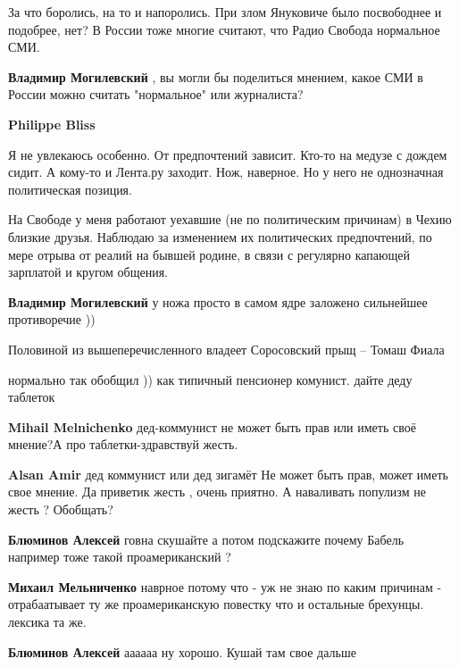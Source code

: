 \begin{itemize}

За что боролись, на то и напоролись. При злом Януковиче было посвободнее и подобрее, нет?
В России тоже многие считают, что Радио Свобода нормальное СМИ.

\begin{itemize} %
\textbf{Владимир Могилевский} , вы могли бы поделиться мнением, какое СМИ в России можно считать "нормальное" или журналиста?

\textbf{Philippe Bliss} 

Я не увлекаюсь особенно. От предпочтений зависит. Кто-то на медузе с дождем
сидит. А кому-то и Лента.ру заходит. Нож, наверное. Но у него не однозначная
политическая позиция.

На Свободе у меня работают уехавшие (не по политическим причинам) в Чехию
близкие друзья. Наблюдаю за изменением их политических предпочтений, по мере
отрыва от реалий на бывшей родине, в связи с регулярно капающей зарплатой и
кругом общения.

\textbf{Владимир Могилевский} у ножа просто в самом ядре заложено сильнейшее противоречие ))
\end{itemize} %

Половиной из вышеперечисленного владеет Соросовский прыщ – Томаш Фиала

нормально так обобщил )) как типичный пенсионер комунист. дайте деду таблеток

\begin{itemize} %
\textbf{Mihail Melnichenko} дед-коммунист не может быть прав или иметь своё мнение?А про таблетки-здравствуй жесть.

\textbf{Alsan Amir} дед коммунист или дед зигамёт Не может быть прав, может иметь свое мнение. Да приветик жесть , очень приятно. А наваливать популизм не жесть ? Обобщать?

\textbf{Блюминов Алексей} говна скушайте а потом подскажите почему Бабель например тоже такой проамериканский ?

\textbf{Михаил Мельниченко} наврное потому что - уж не знаю по каким причинам - отрабаатывает ту же проамериканскую повестку что и остальные брехунцы. лексика та же.

\textbf{Блюминов Алексей} аааааа ну хорошо. Кушай там свое дальше


\end{itemize}
\end{itemize}
